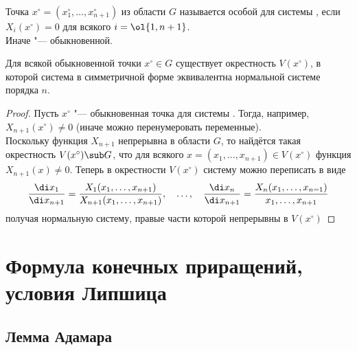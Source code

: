 \begin{definition}
    Точка $ x^\circ = (x_1^\circ, \dots, x_{n + 1}^\circ) $ из области $ G $ называется особой для системы , если $ X_i(x^\circ) = 0 $ для всякого $ i = \ol{1, n + 1} $. \\
    Иначе "--- обыкновенной.
\end{definition}

\begin{theorem}
    Для всякой обыкновенной точки $ x^\circ \in G $ существует окрестность $ V(x^\circ) $, в которой система в симметричной форме  эквивалентна нормальной системе  порядка $ n $.
\end{theorem}

\begin{proof}
    Пусть $ x^\circ $ "--- обыкновенная точка для системы . Тогда, например, $ X_{n + 1}(x^\circ) \ne 0 $ (иначе можно перенумеровать переменные). \\
    Поскольку функция $ X_{n + 1} $ непрерывна в области $ G $, то найдётся такая окрестность $ V(x^\circ) \sub G $, что для всякого $ x = (x_1, \dots, x_{n + 1}) \in V(x^\circ) $ функция $ X_{n + 1}(x) \ne 0 $. Теперь в окрестности $ V(x^\circ) $ систему  можно переписать в виде
    $$ \frac{\di x_1}{\di x_{n + 1}} = \frac{X_1(x_1, \dots, x_{n + 1})}{X_{n + 1}(x_1, \dots, x_{n + 1})}, \quad \dots, \quad \frac{\di x_n}{\di x_{n + 1}} = \frac{X_n(x_1, \dots, x_{n = 1})}{x_1, \dots, x_{n + 1}} $$
    получая нормальную систему, правые части которой непрерывны в $ V(x^\circ) $
\end{proof}

\section{Формула конечных приращений, условия Липшица}

\subsection{Лемма Адамара}

